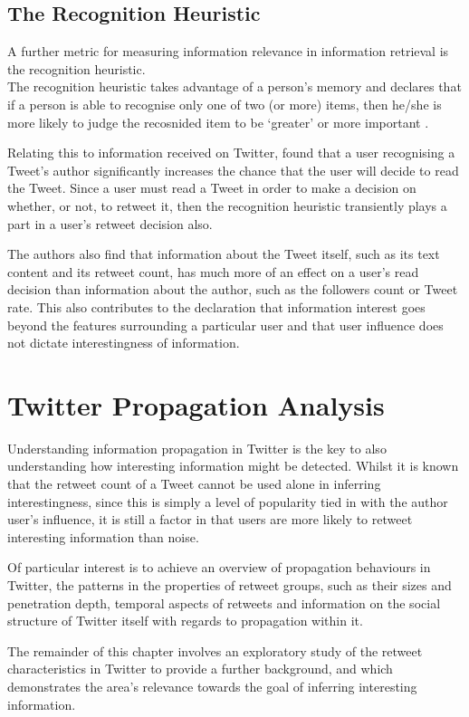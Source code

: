 \subsection{The Recognition Heuristic} 
A further metric for measuring information relevance in information retrieval is the recognition heuristic.\\
The recognition heuristic takes advantage of a person's memory and declares that if a person is able to recognise only one of two (or more) items, then he/she is more likely to judge the recosnided item to be `greater' or more important \cite{oppenheimer03} \cite{goldstein99}.

Relating this to information received on Twitter, \cite{chorley12} found that a user recognising a Tweet's author significantly increases the chance that the user will decide to read the Tweet. Since a user must read a Tweet in order to make a decision on whether, or not, to retweet it, then the recognition heuristic transiently plays a part in a user's retweet decision also.

The authors also find that information about the Tweet itself, such as its text content and its retweet count, has much more of an effect on a user's read decision than information about the author, such as the followers count or Tweet rate. This also contributes to the declaration that information interest goes beyond the features surrounding a particular user and that user influence does not dictate interestingness of information.


\section{Twitter Propagation Analysis}
Understanding information propagation in Twitter is the key to also understanding how interesting information might be detected. Whilst it is known that the retweet count of a Tweet cannot be used alone in inferring interestingness, since this is simply a level of popularity tied in with the author user's influence, it is still a factor in that users are more likely to retweet interesting information than noise.

Of particular interest is to achieve an overview of propagation behaviours in Twitter, the patterns in the properties of retweet groups, such as their sizes and penetration depth, temporal aspects of retweets and information on the social structure of Twitter itself with regards to propagation within it.

The remainder of this chapter involves an exploratory study of the retweet characteristics in Twitter to provide a further background, and which demonstrates the area's relevance towards the goal of inferring interesting information.


